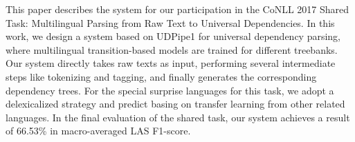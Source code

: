 This paper describes the system for our participation in the CoNLL 2017 Shared Task: Multilingual Parsing from Raw Text to Universal Dependencies. In this work, we design a system based on UDPipe1 for universal dependency parsing, where multilingual transition-based models are trained for different treebanks. Our system directly takes raw texts as input, performing several intermediate steps like tokenizing and tagging, and finally generates the corresponding dependency trees. For the special surprise languages for this task, we adopt a delexicalized strategy and predict basing on transfer learning from other related languages. In the final evaluation of the shared task, our system achieves a result of 66.53\% in macro-averaged LAS F1-score.

